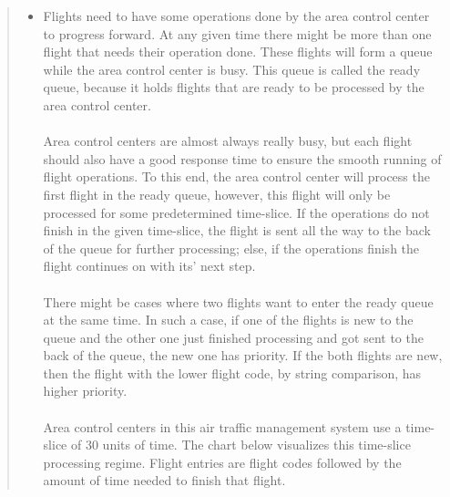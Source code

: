 \documentclass[10pt]{article}
\begin{document}
\begin{quote}
\begin{itemize}
    \item Flights need to have some operations done by the area control center to progress forward. At any given time there might be more than one flight that needs their operation done. These flights will form a queue while the area control center is busy. This queue is called the ready queue, because it holds flights that are ready to be processed by the area control center. 
    \\ \\
    Area control centers are almost always really busy, but each flight should also have a good response time to ensure the smooth running of flight operations. To this end, the area control center will process the first flight in the ready queue, however, this flight will only be processed for some predetermined time-slice. If the operations do not finish in the given time-slice, the flight is sent all the way to the back of the queue for further processing; else, if the operations finish the flight continues on with its' next step. 
    \\ \\
    There might be cases where two flights want to enter the ready queue at the same time. In such a case, if one of the flights is new to the queue and the other one just finished processing and got sent to the back of the queue, the new one has priority. If the both flights are new, then the flight with the lower flight code, by string comparison, has higher priority. 
    \\ \\ 
    Area control centers in this air traffic management system use a time-slice of 30 units of time. The chart below visualizes this time-slice processing regime. Flight entries are flight codes followed by the amount of time needed to finish that flight. 
    \end{itemize}
    
\begin{center}
\end{center}
\end{quote}
\end{document}
